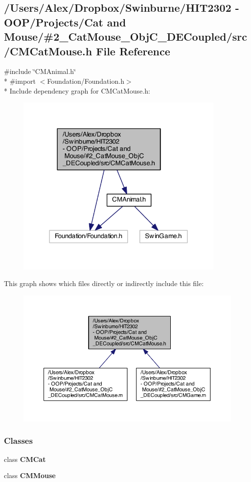 \subsection{/\-Users/\-Alex/\-Dropbox/\-Swinburne/\-H\-I\-T2302 -\/ O\-O\-P/\-Projects/\-Cat and Mouse/\#2\-\_\-\-Cat\-Mouse\-\_\-\-Obj\-C\-\_\-\-D\-E\-Coupled/src/\-C\-M\-Cat\-Mouse.h File Reference}
\label{_c_m_cat_mouse_8h}
{\ttfamily \#include \char`\"{}C\-M\-Animal.\-h\char`\"{}}\\*
{\ttfamily \#import $<$Foundation/\-Foundation.\-h$>$}\\*
Include dependency graph for C\-M\-Cat\-Mouse.\-h\-:
\nopagebreak
\begin{figure}[H]
\begin{center}
\leavevmode
\includegraphics[width=291pt]{_c_m_cat_mouse_8h__incl}
\end{center}
\end{figure}
This graph shows which files directly or indirectly include this file\-:
\nopagebreak
\begin{figure}[H]
\begin{center}
\leavevmode
\includegraphics[width=350pt]{_c_m_cat_mouse_8h__dep__incl}
\end{center}
\end{figure}
\subsubsection*{Classes}
\begin{DoxyCompactItemize}
\item 
class {\bf C\-M\-Cat}
\item 
class {\bf C\-M\-Mouse}
\end{DoxyCompactItemize}
